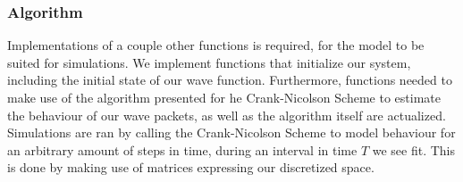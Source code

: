 \documentclass[10pt, nofootinbib, twocolumn]{revtex4-1}
\begin{document}
\newpage
\subsubsection{Algorithm}\label{sec:algorithm} 
Implementations of a couple other functions is required, for the model to be suited for simulations. We implement functions that initialize our system, including the initial state of our wave function. Furthermore, functions needed to make use of the algorithm presented for he Crank-Nicolson Scheme to estimate the behaviour of our wave packets, as well as the algorithm itself are actualized. Simulations are ran by calling the Crank-Nicolson Scheme to model behaviour for an arbitrary amount of steps in time, during an interval in time $T$ we see fit. This is done by making use of matrices expressing our discretized space. \\
\end{document}
